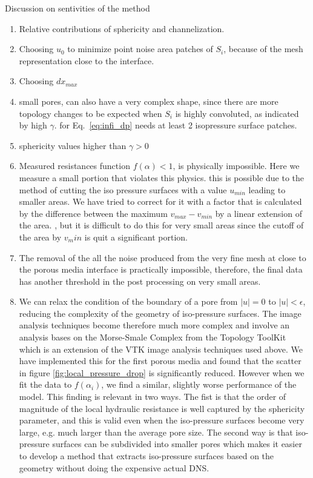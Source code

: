 \documentclass[draft]{agujournal2019}
\begin{document}
Discussion on sentivities of the method 
\begin{enumerate}
	\item Relative contributions of sphericity and channelization. 
	\item Choosing $u_0$ to minimize point noise area patches of $S_i$, because of the mesh representation close to the interface.
	\item Choosing $dx_{max}$
	\item small pores, can also have a very complex shape, since there are more topology changes to be expected when $S_i$ is highly convoluted, as indicated by high $\gamma$. for Eq.~\ref{eq:infi_dp} needs at least 2 isopressure surface patches. 
	\item sphericity values higher than $\gamma >0$
	\item Measured resistances function $f(\alpha) < 1$, is physically impossible. Here we measure a small portion that violates this physics. this is possible due to the method of cutting the iso pressure surfaces with a value $u_{min}$ leading to smaller areas. We have tried to correct for it with a factor that is calculated by the difference between the maximum $v_{max}-v_{min}$ by a linear extension of the area.  , but it is difficult to do this for very small areas since the cutoff of the area by $v_min$ is quit a significant portion. 
	\item The removal of the all the noise produced from the very fine mesh at close to the porous media interface is practically impossible, therefore, the final data has another threshold in the post processing on very small areas.   
	\item We can relax the condition of the boundary of a pore from $|u| = 0$ to $|u| < \epsilon$, reducing the complexity of the geometry of iso-pressure surfaces. The image analysis techniques become therefore much more complex and involve an analysis bases on the Morse-Smale Complex from the Topology ToolKit \cite{tierny_topology_2018} which is an extension of the VTK image analysis techniques used above. We have implemented this for the first porous media and found that the scatter in figure \ref{fig:local_pressure_drop} is significantly reduced. However when we fit the data to $f(\alpha_i)$, we find a similar, slightly worse performance of the model. This finding is relevant in two ways. The fist is that the order of magnitude of the local hydraulic resistance is well captured by the sphericity parameter, and this is valid even when the iso-pressure surfaces become very large, e.g. much larger than the average pore size. The second way is that iso-pressure surfaces can be subdivided into smaller pores which makes it easier to develop a method that extracts iso-pressure surfaces based on the geometry without doing the expensive actual DNS.  
\end{enumerate}
\end{document}
